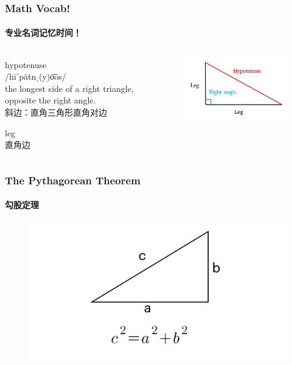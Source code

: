 \documentclass[
	11pt, %
]{beamer}
\begin{document}
\begin{frame}
	\frametitle{Math Vocab!} %
	\framesubtitle{专业名词记忆时间！}
	
	\begin{columns}[t] 
		\begin{column}{0.7\textwidth} %
			{\Huge hypotenuse}\\
	{\LARGE /hīˈpätnˌ(y)o͞os/\\
		\bigskip\bigskip
	the longest side of a right triangle, opposite the right angle. \\ 
	斜边：直角三角形直角对边}
	\bigskip\bigskip\bigskip\bigskip

		{\Huge leg}\\{\LARGE 直角边}
		\end{column}
		\begin{column}{0.3\textwidth} %
					\begin{figure}
				\includegraphics[width=\linewidth]{Hypotenuse.png}
			\end{figure}	
		\end{column}
	\end{columns}
\end{frame}


\begin{frame}
	\frametitle{The Pythagorean Theorem} %
	\framesubtitle{勾股定理}
	\begin{figure}
		\includegraphics[width=\linewidth]{Pythagorean.png}
	\end{figure}	
\end{frame}
\end{document}
